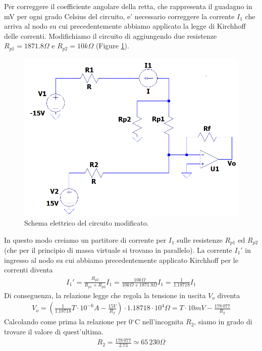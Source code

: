 \documentclass[a4paper,10pt]{article}
\begin{document}
Per correggere il coefficiente angolare della retta, che rappresenta il guadagno in mV per ogni grado Celsius del circuito, e' necessario correggere la corrente $I_1$ che arriva al nodo su cui precedentemente abbiamo applicato la legge di Kirchhoff delle correnti. Modifichiamo il circuito di aggiungendo due resistenze $R_{p1}=1871.8\Omega$ e $R_{p2}=10k\Omega$ (Figure \ref{fig:ckt2mod}).
\begin{figure}[h!]
	\centering
 	\includegraphics[width=0.5\linewidth]{ckt2-2.png}
  	\caption{Schema elettrico del circuito modificato.}
  	\label{fig:ckt2mod}
\end{figure}
\par
In questo modo creiamo un partitore di corrente per $I_1$ sulle resistenze $R_{p1}$ ed $R_{p2}$ (che per il principio di massa virtuale si trovano in parallelo). La corrente $I_1'$ in ingresso al nodo su cui abbiamo precedentemente applicato Kirchhoff per le correnti diventa
\begin{align*}
I_1' =\frac{R_{p2}}{R_{p1}+R_{p2}} I_1 = \frac{10k\Omega}{10k\Omega+1871.8\Omega}I_1 = \frac{1}{1.18718}I_1
\end{align*} 
Di conseguenza, la relazione legge che regola la tensione in uscita $V_o$ diventa
\begin{align*}
V_o=(\frac{1}{1.18718}T\cdot10^{-6}A-\frac{15V}{R_2})\cdot 1.18718\cdot10^4\Omega = T\cdot10mV- \frac{178\,077}{R_2} 
\end{align*}
Calcolando come prima la relazione per 0$^{\circ}$C nell'incognita $R_2$, siamo in grado di trovare il valore di quest'ultima.
\begin{align*}
R_2 = \frac{178\,077}{2.73} \simeq 65\,230 \Omega
\end{align*}
\pagebreak
\end{document}
